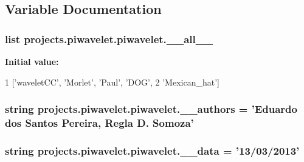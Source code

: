 \subsection{Variable Documentation}
\hypertarget{namespaceprojects_1_1piwavelet_1_1piwavelet_a11313eac556397e6f118674cb99f1822}{
\subsubsection[{\-\_\-\-\_\-all\-\_\-\-\_\-}]{\setlength{\rightskip}{0pt plus 5cm}list projects.\-piwavelet.\-piwavelet.\-\_\-\-\_\-all\-\_\-\-\_\-}}\label{namespaceprojects_1_1piwavelet_1_1piwavelet_a11313eac556397e6f118674cb99f1822}
{\bfseries Initial value\-:}
\begin{DoxyCode}
1 [\textcolor{stringliteral}{'waveletCC'}, \textcolor{stringliteral}{'Morlet'}, \textcolor{stringliteral}{'Paul'}, \textcolor{stringliteral}{'DOG'},
2            \textcolor{stringliteral}{'Mexican\_hat'}]
\end{DoxyCode}
\hypertarget{namespaceprojects_1_1piwavelet_1_1piwavelet_ad6716b4588ff6cee6f330cfc1aed3be3}{
\subsubsection[{\-\_\-\-\_\-authors}]{\setlength{\rightskip}{0pt plus 5cm}string projects.\-piwavelet.\-piwavelet.\-\_\-\-\_\-authors = 'Eduardo dos Santos Pereira, Regla D. Somoza'}}\label{namespaceprojects_1_1piwavelet_1_1piwavelet_ad6716b4588ff6cee6f330cfc1aed3be3}
\hypertarget{namespaceprojects_1_1piwavelet_1_1piwavelet_a4dd414432887a7b3fbe0d3f852f0bed6}{
\subsubsection[{\-\_\-\-\_\-data}]{\setlength{\rightskip}{0pt plus 5cm}string projects.\-piwavelet.\-piwavelet.\-\_\-\-\_\-data = '13/03/2013'}}\label{namespaceprojects_1_1piwavelet_1_1piwavelet_a4dd414432887a7b3fbe0d3f852f0bed6}
